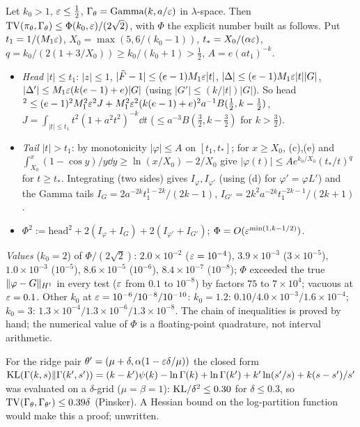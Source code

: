 \begin{theorem}\label{thm:Tprime}\Ps{}
Let $k_0>1$, $\varepsilon\le\frac12$, $\Gamma_\theta=\mathrm{Gamma}(k,a/\varepsilon)$ in $\lambda$-space. Then $\mathrm{TV}(\pi_\theta,\Gamma_\theta)\le\Phi(k_0,\varepsilon)/(2\sqrt2)$, with $\Phi$ the explicit number built as follows. Put $t_1=1/(M_1\varepsilon)$, $X_0=\max(5,6/(k_0-1))$, $t_*=X_0/(\alpha\varepsilon)$, $q=k_0/(2(1+3/X_0))\ge k_0/(k_0+1)>\frac12$, $A=e(at_1)^{-k}$.
\begin{itemize}[nosep]
\item \emph{Head} $|t|\le t_1$: $|z|\le1$, $|\tilde F-1|\le(e-1)M_1\varepsilon|t|$, $|\Delta|\le(e-1)M_1\varepsilon|t||G|$, $|\Delta'|\le M_1\varepsilon(k(e-1)+e)|G|$ (using $|G'|\le(k/|t|)|G|$). So head$^2\le(e-1)^2M_1^2\varepsilon^2J+M_1^2\varepsilon^2(k(e-1)+e)^2a^{-1}B(\tfrac12,k-\tfrac12)$, $J=\int_{|t|\le t_1}t^2(1+a^2t^2)^{-k}\dd t$ ($\le a^{-3}B(\frac32,k-\frac32)$ for $k>\frac32$).
\item \emph{Tail} $|t|>t_1$: by monotonicity $|\varphi|\le A$ on $[t_1,t_*]$; for $x\ge X_0$, (c),(e) and $\int_{X_0}^x(1-\cos y)/y\dd y\ge\ln(x/X_0)-2/X_0$ give $|\varphi(t)|\le Ae^{k_0/X_0}(t_*/t)^q$ for $t\ge t_*$. Integrating (two sides) gives $I_\varphi,I_{\varphi'}$ (using (d) for $\varphi'=\varphi L'$) and the Gamma tails $I_G=2a^{-2k}t_1^{1-2k}/(2k-1)$, $I_{G'}=2k^2a^{-2k}t_1^{-2k-1}/(2k+1)$.
\item $\Phi^2:=\mathrm{head}^2+2(I_\varphi+I_G)+2(I_{\varphi'}+I_{G'})$; $\Phi=O(\varepsilon^{\min(1,k-1/2)})$.
\end{itemize}
\end{theorem}
\emph{Values} ($k_0=2$) of $\Phi/(2\sqrt2)$: $2.0\times10^{-2}$ ($\varepsilon=10^{-4}$), $3.9\times10^{-3}$ ($3\times10^{-5}$), $1.0\times10^{-3}$ ($10^{-5}$), $8.6\times10^{-5}$ ($10^{-6}$), $8.4\times10^{-7}$ ($10^{-8}$); $\Phi$ exceeded the true $\lVert \varphi-G\rVert_{H^1}$ in every test ($\varepsilon$ from $0.1$ to $10^{-8}$) by factors $75$ to $7\times10^4$; vacuous at $\varepsilon=0.1$. Other $k_0$ at $\varepsilon=10^{-6}/10^{-8}/10^{-10}$: $k_0=1.2$: $0.10/4.0\times10^{-3}/1.6\times10^{-4}$; $k_0=3$: $1.3\times10^{-4}/1.3\times10^{-6}/1.3\times10^{-8}$.
The chain of inequalities is proved by hand; the numerical value of $\Phi$ is a floating-point quadrature, not interval arithmetic.

\begin{proposition}\label{prop:twogamma}\Nt{}
For the ridge pair $\theta'=(\mu+\delta,\alpha(1-\varepsilon\delta/\mu))$ the closed form $\mathrm{KL}(\Gamma(k,s)\|\Gamma(k',s'))=(k-k')\psi(k)-\ln\Gamma(k)+\ln\Gamma(k')+k'\ln(s'/s)+k(s-s')/s'$ was evaluated on a $\delta$-grid ($\mu=\beta=1$): $\mathrm{KL}/\delta^2\le0.30$ for $\delta\le0.3$, so $\mathrm{TV}(\Gamma_\theta,\Gamma_{\theta'})\le0.39\delta$ (Pinsker). A Hessian bound on the log-partition function would make this a proof; unwritten.
\end{proposition}

